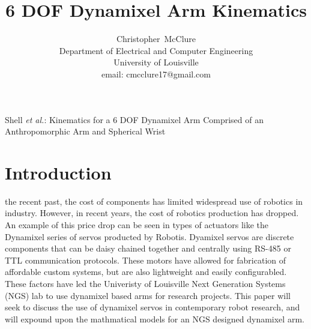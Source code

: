 \documentclass[10pt,journal]{IEEEtran}
\begin{document}
%
{Shell \MakeLowercase{\textit{et al.}}: Kinematics for a 6 DOF Dynamixel Arm Comprised of an Anthropomorphic Arm and Spherical Wrist}

\title{6 DOF Dynamixel Arm Kinematics}
\author{Christopher~McClure\\ Department of Electrical and Computer Engineering\\University of Louisville\\email: cmcclure17@gmail.com}

\maketitle

\IEEEdisplaynontitleabstractindextext


\ifCLASSOPTIONcompsoc
{}
\else
\section{Introduction}
\label{sec:introduction}
\fi

 the recent past, the cost of components has limited widespread use of robotics in industry. However, in recent years, the cost of robotics production has dropped\cite{west2015happens}. An example of this price drop can be seen in types of actuators like the Dynamixel series of servos producted by Robotis\cite{dynamixel}. Dyamixel servos are discrete components that can be daisy chained together and  centrally using RS-485 or TTL communication protocols\cite{dynamixelChart}. These motors have allowed for fabrication of affordable custom systems, but are also lightweight and easily configurabled. These factors have led the Univeristy of Louisville Next Generation Systems (NGS) lab to use dynamixel based arms for research projects. This paper will seek to discuss the use of dynamixel servos in contemporary robot research, and will expound upon the mathmatical models for an NGS designed dynamixel arm.
\end{document}
